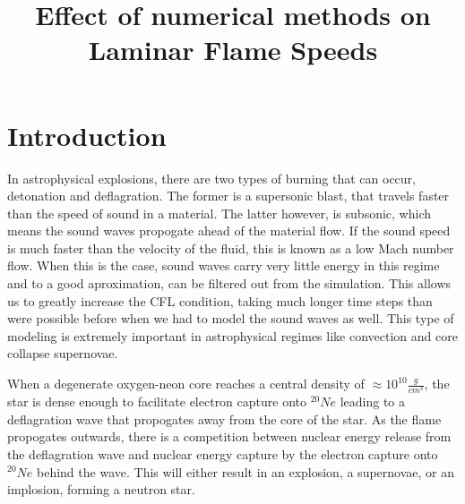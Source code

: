 \documentclass[preprint,times,tighten]{aastex63}
\begin{document}
\title{Effect of numerical methods on Laminar Flame Speeds}








\begin{abstract}
\end{abstract}

\keywords{}

\section{Introduction}\label{Sec:Introduction}
In astrophysical explosions, there are two types of burning that can occur, detonation and deflagration. The former is a supersonic blast, that travels faster than the speed of sound in a material. The latter however, is subsonic, which means the sound waves propogate ahead of the material flow. If the sound speed is much faster than the velocity of the fluid, this is known as a low Mach number flow. When this is the case, sound waves carry very little energy in this regime and to a good aproximation, can be filtered out from the simulation. This allows us to greatly increase the CFL condition, taking much longer time steps than were possible before when we had to model the sound waves as well. This type of modeling is extremely important in astrophysical regimes like convection and core collapse supernovae.

When a degenerate oxygen-neon core reaches a central density of $\approx 10^{10} \frac{g}{cm^3}$, the star is dense enough to facilitate electron capture onto $^{20}Ne$ leading to a deflagration wave that propogates away from the core of the star. As the flame propogates outwards, there is a competition between nuclear energy release from the deflagration wave and nuclear energy capture by the electron capture onto $^{20}Ne$ behind the wave. This will either result in an explosion, a supernovae, or an implosion, forming a neutron star.  \citep{1991ApJ...367L..19N} \citep{Zha_2019}
\end{document}
